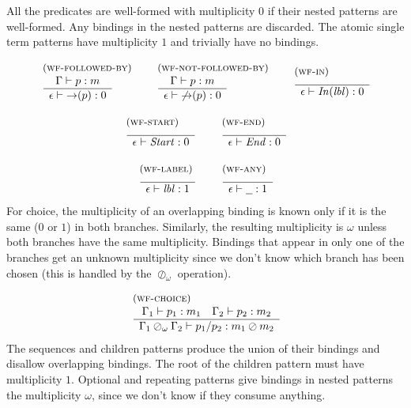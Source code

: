 \documentclass{article}
\newcommand{\rulename}{\textsc}
\newcommand{\irule}[3]{\begin{array}{l}{~\small\mbox{(\rulename{#1})}}\\\;\frac{\begin{array}{c}#2\end{array}}{\begin{array}{l}#3\end{array}}\end{array}}
\newcommand{\lbl}{\ensuremath{\mathit{lbl}}}
\newcommand{\wfp}[3]{\ensuremath{#1 \vdash #2 : #3}}
\newcommand{\por}[2]{\ensuremath{#1/#2}}
\newcommand{\any}{\ensuremath{\text{\underline{\hspace{0.6em}}}}}
\newcommand{\fb}[1]{\ensuremath{\mathop{\rightarrow}(#1)}}
\newcommand{\nfb}[1]{\ensuremath{\mathop{\not\rightarrow}(#1)}}
\newcommand{\pin}[1]{\ensuremath{\mathit{In}(#1)}}
\newcommand{\pstart}{\ensuremath{\mathit{Start}}}
\newcommand{\pend}{\ensuremath{\mathit{End}}}
\begin{document}
All the predicates are well-formed with multiplicity $0$ if their
nested patterns are well-formed. Any bindings in the nested
patterns are discarded.
%
The atomic single term patterns have multiplicity $1$ and
trivially have no bindings.

\[
  \begin{array}{c}
    \irule{wf-followed-by}{
    \wfp{\Gamma}{p}{m}
    }{
    \wfp{\epsilon}{\fb{p}}{0}
    }
    \quad
    \irule{wf-not-followed-by}{
    \wfp{\Gamma}{p}{m}
    }{
    \wfp{\epsilon}{\nfb{p}}{0}
    }
    \quad
    \irule{wf-in}{
    }{
    \wfp{\epsilon}{\pin{\lbl}}{0}
    }
    \\\\
    \irule{wf-start}{
    }{
    \wfp{\epsilon}{\pstart}{0}
    }
    \quad
    \irule{wf-end}{
    }{
    \wfp{\epsilon}{\pend}{0}
    }
    \\\\
    \irule{wf-label}{
    }{
    \wfp{\epsilon}{\lbl}{1}
    }
    \quad
    \irule{wf-any}{
    }{
    \wfp{\epsilon}{\any}{1}
    }
  \end{array}
\]
%
For choice, the multiplicity of an overlapping binding is known
only if it is the same ($0$ or $1$) in both branches. Similarly,
the resulting multiplicity is $\omega$ unless both branches have
the same multiplicity. Bindings that appear in only one of the
branches get an unknown multiplicity since we don't know which
branch has been chosen (this is handled by the $\oslash_\omega$
operation).

\[
  \begin{array}{c}
    \irule{wf-choice}{
    \wfp{\Gamma_1}{p_1}{m_1}
    \quad
    \wfp{\Gamma_2}{p_2}{m_2}
    }{
    \wfp{\Gamma_1 \oslash_\omega \Gamma_2}{\por{p_1}{p_2}}{m_1\oslash m_2}
    }
  \end{array}
\]
%
The sequences and children patterns produce the union of their
bindings and disallow overlapping bindings. The root of the
children pattern must have multiplicity $1$.
%
Optional and repeating patterns give bindings in nested patterns
the multiplicity $\omega$, since we don't know if they consume
anything.
\end{document}
